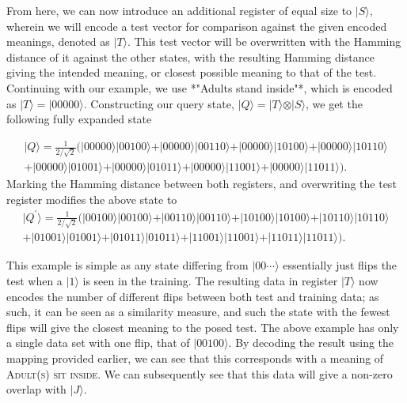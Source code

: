 From here, we can now introduce an additional register of equal size to $\vert S\rangle$, wherein we will encode a test vector for comparison against the given encoded meanings, denoted as $\vert T \rangle$. This test vector will be overwritten with the Hamming distance of it against the other states, with the resulting Hamming distance giving the intended meaning, or closest possible meaning to that of the test. Continuing with our example, we use *"Adults stand inside"*, which is encoded as $\vert T \rangle = \vert 00000 \rangle$. Constructing our query state, $\vert Q \rangle = \vert T \rangle \otimes \vert S\rangle$, we get the following fully expanded state

\begin{eqnarray*}
\vert Q \rangle = \frac{1}{2/\sqrt{2}} (\vert 00000 \rangle\vert 00100 \rangle + \vert 00000 \rangle\vert 00110 \rangle + \vert 00000 \rangle\vert 10100 \rangle + \vert 00000 \rangle\vert 10110 \rangle \\+\vert 00000 \rangle\vert 01001 \rangle + \vert 00000 \rangle\vert 01011 \rangle + \vert 00000 \rangle\vert 11001 \rangle + \vert 00000 \rangle\vert 11011 \rangle).
\end{eqnarray*}
Marking the Hamming distance between both registers, and overwriting the test register modifies the above state to
\begin{eqnarray*}
\vert Q^{\prime} \rangle = \frac{1}{2/\sqrt{2}} (\vert 00100 \rangle\vert 00100 \rangle + \vert 00110 \rangle\vert 00110 \rangle + \vert 10100 \rangle\vert 10100 \rangle +  \vert 10110 \rangle\vert 10110 \rangle \\+\vert 01001 \rangle\vert 01001 \rangle + \vert 01011 \rangle\vert 01011 \rangle + \vert 11001 \rangle\vert 11001 \rangle + \vert 11011 \rangle\vert 11011 \rangle).
\end{eqnarray*}

This example is simple as any state differing from $\vert 00\cdots\rangle$ essentially just flips the test when a $\vert 1\rangle$ is seen in the training. The resulting data in register $\vert T \rangle$ now encodes the number of different flips between both test and training data; as such, it can be seen as a similarity measure, and such the state with the fewest flips will give the closest meaning to the posed test. The above example has only a single data set with one flip, that of $\vert 00100 \rangle$. By decoding the result using the mapping provided earlier, we can see that this corresponds with a meaning of \textsc{Adult(s) sit inside}. We can subsequently see that this data will give a non-zero overlap with $\vert J \rangle$.

